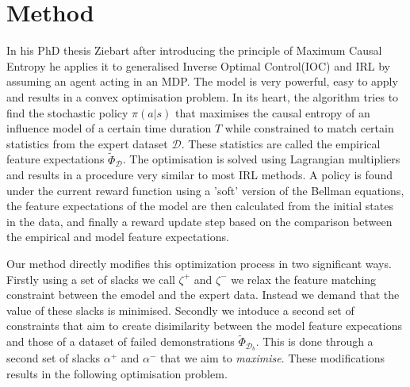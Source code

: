 \documentclass[conference]{IEEEtran}
\begin{document}
\section{Method}
	In his PhD thesis Ziebart after introducing the principle of Maximum Causal Entropy he applies it to generalised Inverse Optimal Control(IOC) and IRL by assuming an agent acting in an MDP. The model is very powerful, easy to apply and results in a convex optimisation problem. In its heart, the algorithm tries to find the stochastic policy $\pi(a|s)$ that maximises the causal entropy of an influence model of a certain time duration $T$ while constrained to match certain statistics from the expert dataset $\mathcal{D}$. These statistics are called the empirical feature expectations $\widetilde{\Phi}_{\mathcal{D}}$. The optimisation is solved using Lagrangian multipliers and results in a procedure very similar to most IRL methods. A policy
	is found under the current reward function using a 'soft' version of the Bellman equations, the feature expectations of the model are then calculated from the initial  states in the data, and finally a reward update step based on the comparison between the empirical and model feature expectations.

	Our method directly modifies this optimization process in two significant ways. Firstly using a set of slacks we call $\zeta^+$ and $\zeta^-$ we relax the feature matching constraint between the emodel and the expert data. Instead we demand that the value of these slacks is minimised. Secondly we intoduce a second set of constraints that aim to create disimilarity between the model feature expecations and those of a dataset of failed demonstrations $\widetilde{\Phi}_{\mathcal{D}_b}$. This is done through a second set of slacks $\alpha^+$ and $\alpha^-$ that we aim to \emph{maximise}. These modifications results in the following optimisation problem.
	
\end{document}
